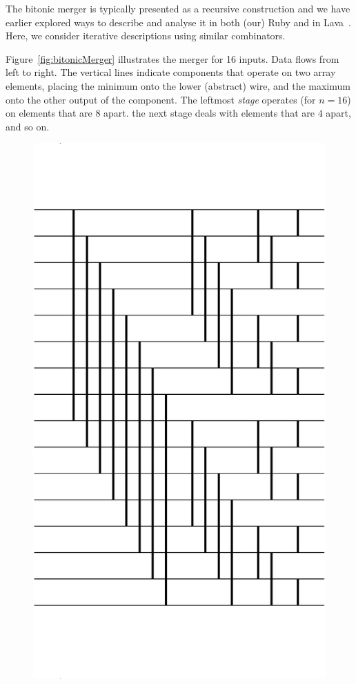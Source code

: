 \documentclass[]{sigplanconf}
\begin{document}
The bitonic merger is typically presented as a recursive
construction and we have earlier explored ways to describe
and analyse it in both (our) Ruby and in Lava~\cite{sortsRuby,LavaSorter}.
Here, we consider iterative descriptions using similar combinators.

Figure~\ref{fig:bitonicMerger} illustrates the merger for 16 inputs.
Data flows from left to right.
The vertical lines indicate components that operate on two array elements, placing the minimum onto the lower (abstract) wire, and the maximum onto the other output
of the component.
The leftmost {\em stage} operates (for $n=16$) on elements that are 
$8$ apart. the next stage deals with elements that are $4$ apart, and so on.

\begin{figure}
\centering
\includegraphics[scale=0.25]{bitonic}

\end{figure}
\end{document}
